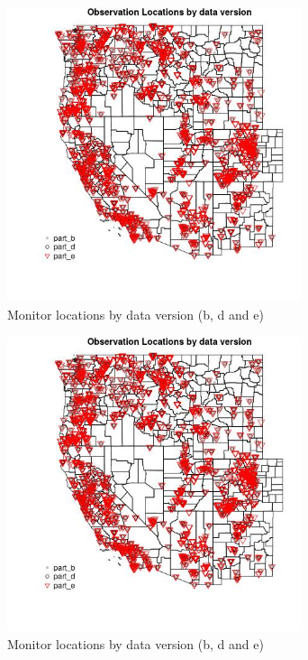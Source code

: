 \begin{figure} 
\centering  
\includegraphics[width=0.77\textwidth]{Code_Outputs/PM25_obs_locations_by_data_version_Obs_Locations_versions_bde.jpg} 
\caption{\label{fig:PM25_obs_locations_by_data_versionObs_Locations_versions_bde}Monitor locations by data version (b, d and e)} 
\end{figure} 
 

\begin{figure} 
\centering  
\includegraphics[width=0.77\textwidth]{Code_Outputs/PM25_obs_locations_by_data_version_Obs_Locations_versions_bde.jpg} 
\caption{\label{fig:PM25_obs_locations_by_data_versionObs_Locations_versions_bde}Monitor locations by data version (b, d and e)} 
\end{figure} 
 

